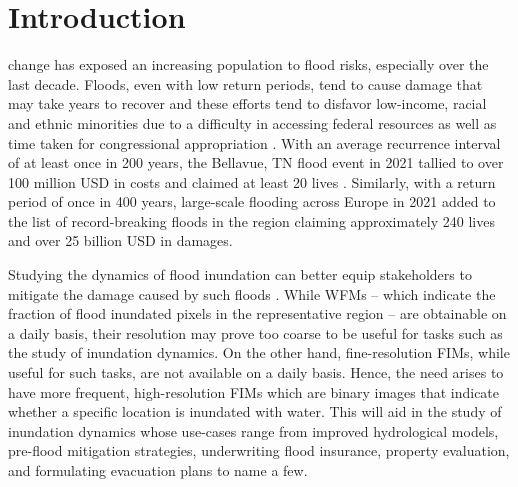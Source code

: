 \section{Introduction}
\label{sec:Introduction}


 change has exposed an increasing population to flood risks, especially over the last decade\cite{Tellman2021SatelliteFloods}. 
Floods, even with low return periods, tend to cause damage that may take years to recover and these efforts tend to disfavor low-income, racial and ethnic minorities due to a difficulty in accessing federal resources as well as time taken for congressional appropriation \cite{Wilson2021}. With an average recurrence interval of at least once in 200 years, the Bellavue, TN flood event in 2021 tallied to over 100 million USD in costs and claimed at least 20 lives \cite{StormEventDatabaseEntry}. Similarly, with a return period of once in 400 years, large-scale flooding across Europe in 2021 added to the list of record-breaking floods in the region claiming approximately 240 lives and over 25 billion USD in damages\cite{ActurialPostEuropeanFloodDamageAssesmentArticle}. 


Studying the dynamics of flood inundation can better equip stakeholders to mitigate the damage caused by such floods \cite{Romero2015RemoteSensingFloodInundation}. While \acp{WFM} -- which indicate the fraction of flood inundated pixels in the representative region -- are obtainable on a daily basis, their resolution may prove too coarse to be useful for tasks such as the study of inundation dynamics. On the other hand, fine-resolution \acp{FIM}, while useful for such tasks, are not available on a daily basis. Hence, the need arises to have more frequent, high-resolution \acp{FIM} which are binary images that indicate whether a specific location is inundated with water. This will aid in the study of inundation dynamics whose use-cases range from improved hydrological models, pre-flood mitigation strategies, underwriting flood insurance, property evaluation, and formulating evacuation plans to name a few. 


